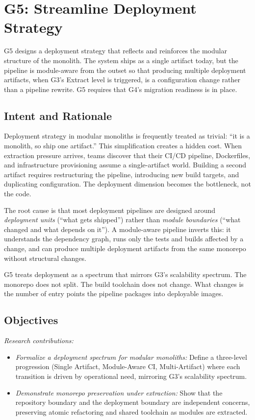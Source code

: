 \pagebreak
\section{G5: Streamline Deployment Strategy}
\label{sec:g5-streamline-deployment-strategy}

G5 designs a deployment strategy that reflects and reinforces the modular structure of the monolith. The system ships as a single artifact today, but the pipeline is module-aware from the outset so that producing multiple deployment artifacts, when G3's Extract level is triggered, is a configuration change rather than a pipeline rewrite. G5 requires that G4's migration readiness is in place.

\subsection*{Intent and Rationale}

Deployment strategy in modular monoliths is frequently treated as trivial: ``it is a monolith, so ship one artifact.'' This simplification creates a hidden cost. When extraction pressure arrives, teams discover that their CI/CD pipeline, Dockerfiles, and infrastructure provisioning assume a single-artifact world. Building a second artifact requires restructuring the pipeline, introducing new build targets, and duplicating configuration. The deployment dimension becomes the bottleneck, not the code.

The root cause is that most deployment pipelines are designed around \emph{deployment units} (``what gets shipped'') rather than \emph{module boundaries} (``what changed and what depends on it''). A module-aware pipeline inverts this: it understands the dependency graph, runs only the tests and builds affected by a change, and can produce multiple deployment artifacts from the same monorepo without structural changes.

G5 treats deployment as a spectrum that mirrors G3's scalability spectrum. The monorepo does not split. The build toolchain does not change. What changes is the number of entry points the pipeline packages into deployable images.

\subsection*{Objectives}

\emph{Research contributions:}
\begin{itemize}[itemsep=8pt,topsep=2pt]
  \item \emph{Formalize a deployment spectrum for modular monoliths:} Define a three-level progression (Single Artifact, Module-Aware CI, Multi-Artifact) where each transition is driven by operational need, mirroring G3's scalability spectrum.
  \item \emph{Demonstrate monorepo preservation under extraction:} Show that the repository boundary and the deployment boundary are independent concerns, preserving atomic refactoring and shared toolchain as modules are extracted.
\end{itemize}

